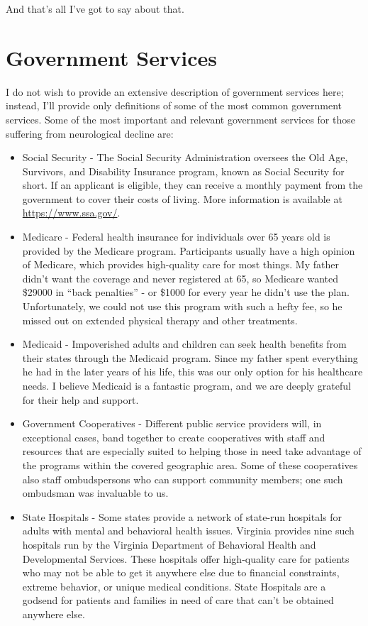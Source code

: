 \documentclass{article}
\begin{document}
And that's all I've got to say about that.

\section*{Government Services}

I do not wish to provide an extensive description of government services here; instead, I'll provide only definitions of some of the most common government services. Some of the most important and relevant government services for those suffering from neurological decline are:

\begin{itemize}
    \item Social Security - The Social Security Administration oversees the Old Age, Survivors, and Disability Insurance program, known as Social Security for short. If an applicant is eligible, they can receive a monthly payment from the government to cover their costs of living. More information is available at \url{https://www.ssa.gov/}.
    \item Medicare - Federal health insurance for individuals over 65 years old is provided by the Medicare program. Participants usually have a high opinion of Medicare, which provides high-quality care for most things. My father didn't want the coverage and never registered at 65, so Medicare wanted \$29000 in ``back penalties'' - or \$1000 for every year he didn't use the plan. Unfortunately, we could not use this program with such a hefty fee, so he missed out on extended physical therapy and other treatments.
    \item Medicaid - Impoverished adults and children can seek health benefits from their states through the Medicaid program. Since my father spent everything he had in the later years of his life, this was our only option for his healthcare needs. I believe Medicaid is a fantastic program, and we are deeply grateful for their help and support.
    \item Government Cooperatives - Different public service providers will, in exceptional cases, band together to create cooperatives with staff and resources that are especially suited to helping those in need take advantage of the programs within the covered geographic area. Some of these cooperatives also staff ombudspersons who can support community members; one such ombudsman was invaluable to us.
    \item State Hospitals - Some states provide a network of state-run hospitals for adults with mental and behavioral health issues. Virginia provides nine such hospitals run by the Virginia Department of Behavioral Health and Developmental Services. These hospitals offer high-quality care for patients who may not be able to get it anywhere else due to financial constraints, extreme behavior, or unique medical conditions. State Hospitals are a godsend for patients and families in need of care that can't be obtained anywhere else.
\end{itemize}
\end{document}

